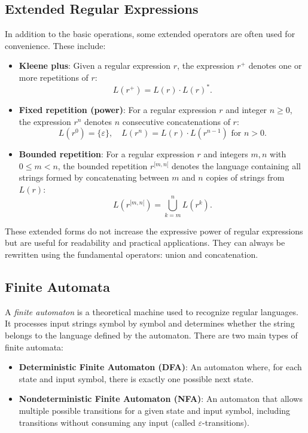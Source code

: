 \subsection{Extended Regular Expressions}
In addition to the basic operations, some extended operators are often used for convenience. These include:

\begin{itemize}
    \item \textbf{Kleene plus}: Given a regular expression $r$, the expression $r^+$ denotes one or more repetitions of $r$:
    \[
    L(r^+) = L(r) \cdot L(r)^*.
    \]

    \item \textbf{Fixed repetition (power)}: For a regular expression $r$ and integer $n \geq 0$, the expression $r^n$ denotes $n$ consecutive concatenations of $r$:
    \[
    L(r^0) = \{ \varepsilon \}, \quad L(r^n) = L(r) \cdot L(r^{n-1}) \text{ for } n > 0.
    \]

	 \item \textbf{Bounded repetition}: For a regular expression $r$ and integers $m, n$ with $0 \leq m < n$, the bounded repetition $r^{[m,n[}$ denotes the language containing all strings formed by concatenating between $m$ and $n$ copies of strings from $L(r)$:
    \[
    L(r^{[m,n[}) = \bigcup_{k=m}^{n} L(r^k).
    \]
\end{itemize}

These extended forms do not increase the expressive power of regular expressions but are useful for readability and practical applications. They can always be rewritten using the fundamental operators: union and concatenation.

\subsection{Finite Automata}

A \emph{finite automaton} is a theoretical machine used to recognize regular languages. It processes input strings symbol by symbol and determines whether the string belongs to the language defined by the automaton. There are two main types of finite automata:

\begin{itemize}
    \item \textbf{Deterministic Finite Automaton (DFA)}: An automaton where, for each state and input symbol, there is exactly one possible next state.
    \item \textbf{Nondeterministic Finite Automaton (NFA)}: An automaton that allows multiple possible transitions for a given state and input symbol, including transitions without consuming any input (called $\varepsilon$-transitions).
\end{itemize}

